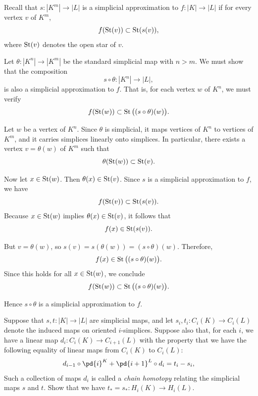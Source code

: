 \begin{solution}
  Recall that $s : |K^m| \to |L|$ is a simplicial approximation to $f : |K| \to |L|$ if for every vertex $v$ of $K^m$,
  \[%
    f(\St(v)) \subset \St(s(v))
  ,\]%
  where $\operatorname{St}(v)$ denotes the open star of $v$.

  Let $\theta : |K^n| \to |K^m|$ be the standard simplicial map with $n > m$. We must show that the composition
  \[%
    s \circ \theta : |K^n| \to |L|
  ,\]%
  is also a simplicial approximation to $f$. That is, for each vertex $w$ of $K^n$, we must verify
  \[%
    f(\St(w)) \subset \St\big((s \circ \theta)(w)\big)
  .\]%

  Let $w$ be a vertex of $K^n$. Since $\theta$ is simplicial, it maps vertices of $K^n$ to vertices of $K^m$, and it carries simplices linearly onto simplices. In particular, there exists a vertex $v = \theta(w)$ of $K^m$ such that
  \[%
    \theta(\St(w)) \subset \St(v)
  .\]%

  Now let $x \in \operatorname{St}(w)$. Then $\theta(x) \in \operatorname{St}(v)$. Since $s$ is a simplicial approximation to $f$, we have
  \[%
    f(\St(v)) \subset \St(s(v))
  .\]%
  Because $x \in \operatorname{St}(w)$ implies $\theta(x) \in \operatorname{St}(v)$, it follows that
  \[%
    f(x) \in \St(s(v))
  .\]%

  But $v = \theta(w)$, so $s(v) = s(\theta(w)) = (s \circ \theta)(w)$. Therefore,
  \[%
    f(x) \in \St\big((s \circ \theta)(w)\big)
  .\]%
  Since this holds for all $x \in \operatorname{St}(w)$, we conclude
  \[%
    f(\St(w)) \subset \St\big((s \circ \theta)(w)\big)
  .\]%

  Hence $s \circ \theta$ is a simplicial approximation to $f$.
\end{solution}

\begin{problem}[3]
  Suppose that $s, t : |K| \to |L|$ are simplicial maps, and let $s_i, t_i : C_i(K) \to C_i(L)$ denote the induced maps on oriented $i$-simplices. Suppose also that, for each $i$, we have a linear map $d_i : C_i(K) \to C_{i+1}(L)$ with the property that we have the following equality of linear maps from $C_i(K)$ to $C_i(L)$:
  \[%
    d_{i-1} \circ \pd{i}^K + \pd{i+1}^L \circ d_i = t_i - s_i
  ,\]%
  Such a collection of maps $d_i$ is called a \textit{chain homotopy} relating the simplicial maps $s$ and $t$. Show that we have $t_* = s_* : H_i(K) \to H_i(L)$.
\end{problem}

